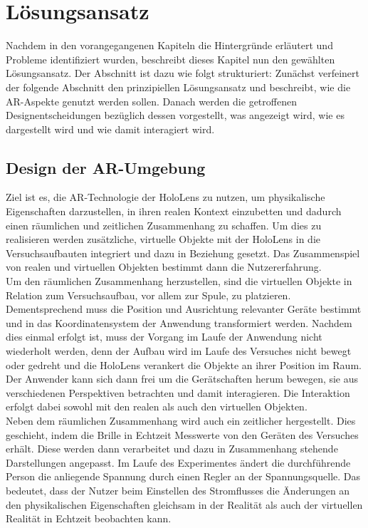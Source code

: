 \section{Lösungsansatz}
\label{sec-4}
Nachdem in den vorangegangenen Kapiteln die Hintergründe erläutert und Probleme identifiziert wurden, beschreibt dieses Kapitel nun den gewählten Lösungsansatz. Der Abschnitt ist dazu wie folgt strukturiert:
Zunächst verfeinert der folgende Abschnitt den prinzipiellen Lösungsansatz und beschreibt, wie die AR-Aspekte genutzt werden sollen. Danach werden die getroffenen Designentscheidungen bezüglich dessen vorgestellt, was angezeigt wird, wie es dargestellt wird und wie damit interagiert wird.

\subsection{Design der AR-Umgebung}
\label{sec-4-1}
Ziel ist es, die AR-Technologie der HoloLens zu nutzen, um physikalische Eigenschaften darzustellen, in ihren realen Kontext einzubetten und dadurch einen räumlichen und zeitlichen Zusammenhang zu schaffen. Um dies zu realisieren werden zusätzliche, virtuelle Objekte mit der HoloLens in die Versuchsaufbauten integriert und dazu in Beziehung gesetzt. Das Zusammenspiel von realen und virtuellen Objekten bestimmt dann die Nutzererfahrung.\\

Um den räumlichen Zusammenhang herzustellen, sind die virtuellen Objekte in Relation zum Versuchsaufbau, vor allem zur Spule, zu platzieren. Dementsprechend muss die Position und Ausrichtung relevanter Geräte bestimmt und in das Koordinatensystem der Anwendung transformiert werden. Nachdem dies einmal erfolgt ist, muss der Vorgang im Laufe der Anwendung nicht wiederholt werden, denn der Aufbau wird im Laufe des Versuches nicht bewegt oder gedreht und die HoloLens verankert die Objekte an ihrer Position im Raum. Der Anwender kann sich dann frei um die Gerätschaften herum bewegen, sie aus verschiedenen Perspektiven betrachten und damit interagieren. Die Interaktion erfolgt dabei sowohl mit den realen als auch den virtuellen Objekten.\\

Neben dem räumlichen Zusammenhang wird auch ein zeitlicher hergestellt. Dies geschieht, indem die Brille in Echtzeit Messwerte von den Geräten des Versuches erhält. Diese werden dann verarbeitet und dazu in Zusammenhang stehende Darstellungen angepasst. Im Laufe des Experimentes ändert die durchführende Person die anliegende Spannung durch einen Regler an der Spannungsquelle. Das bedeutet, dass der Nutzer beim Einstellen des Stromflusses die Änderungen an den physikalischen Eigenschaften gleichsam in der Realität als auch der virtuellen Realität in Echtzeit beobachten kann.\\

